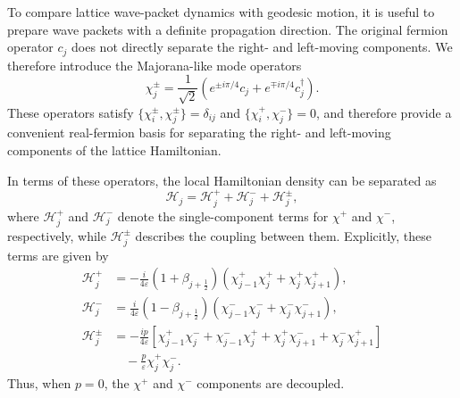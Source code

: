 \documentclass[reprint,amsmath,amssymb,aps,prb,showkeys]{revtex4-2}
\begin{document}
To compare lattice wave-packet dynamics with geodesic motion, it is useful to prepare wave packets with a definite propagation direction. The original fermion operator $c_j$ does not directly separate the right- and left-moving components. We therefore introduce the Majorana-like mode operators
\begin{equation}
\chi_j^\pm =
\frac{1}{\sqrt{2}}
\left(
e^{\pm i\pi/4} c_j
+
e^{\mp i\pi/4} c_j^\dagger
\right).
\label{eq:chi_pm_def}
\end{equation}
These operators satisfy $\{\chi_i^\pm,\chi_j^\pm\}=\delta_{ij}$ and $\{\chi_i^+,\chi_j^-\}=0$, and therefore provide a convenient real-fermion basis for separating the right- and left-moving components of the lattice Hamiltonian.

In terms of these operators, the local Hamiltonian density can be separated as
\begin{equation}
\mathcal{H}_j = \mathcal{H}_j^+ + \mathcal{H}_j^- + \mathcal{H}_j^\pm ,
\label{eq:H_decomposition}
\end{equation}
where $\mathcal{H}_j^+$ and $\mathcal{H}_j^-$ denote the single-component terms for $\chi^+$ and $\chi^-$, respectively, while $\mathcal{H}_j^\pm$ describes the coupling between them. Explicitly, these terms are given by
\begin{align}
\mathcal{H}_j^+
&=
-\frac{i}{4\varepsilon}
(1+\beta_{j+\frac{1}{2}})
\left(
\chi_{j-1}^+\chi_j^+
+
\chi_j^+\chi_{j+1}^+
\right),
\label{eq:H_plus}
\\
\mathcal{H}_j^-
&=
\frac{i}{4\varepsilon}
(1-\beta_{j+\frac{1}{2}})
\left(
\chi_{j-1}^-\chi_j^-
+
\chi_j^-\chi_{j+1}^-
\right),
\label{eq:H_minus}
\\
\mathcal{H}_j^\pm
&=
-\frac{i p}{4\varepsilon}
\left[
\chi_{j-1}^+\chi_j^-
+
\chi_{j-1}^-\chi_j^+
+
\chi_j^+\chi_{j+1}^-
+
\chi_j^-\chi_{j+1}^+
\right]
\nonumber\\
&\quad
-
\frac{p}{\varepsilon}
\chi_j^+\chi_j^-.
\label{eq:H_pm}
\end{align}
Thus, when $p=0$, the $\chi^+$ and $\chi^-$ components are decoupled.
\end{document}
